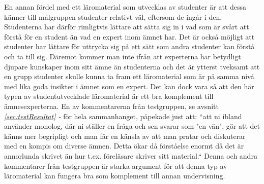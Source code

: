 \documentclass[12pt,a4paper,twoside,openright]{article}
\begin{document}
En annan fördel med ett läromaterial som utvecklas av studenter är att
dessa känner till målgruppen studenter relativt väl, eftersom de ingår
i den. Studenterna har därför rimligtvis lättare att sätta sig in i
vad som är svårt att förstå för en student än vad en expert inom ämnet
har. Det är också möjligt att studenter har lättare för uttrycka sig
på ett sätt som andra studenter kan förstå och ta till sig. Däremot
kommer man inte ifrån att experterna har betydligt djupare kunskaper
inom sitt ämne än studenterna och det är ytterst tveksamt att en grupp
studenter skulle kunna ta fram ett läromaterial som är på samma nivå
med lika goda insikter i ämnet som en expert. Det kan dock vara så att
den här typen av studentutvecklade läromaterial är ett bra komplement
till ämnesexperterna. En av kommentarerna från testgruppen, se avsnitt
\textit{\ref{sec:testResultat} - } för hela
sammanhanget, påpekade just att: “att ni ibland använder monolog, där
ni ställer en fråga och sen svarar som "en vän", gör att det känns mer
begripligt och man får en känsla av att man pratar och diskuterar med
en kompis om diverse ämnen. Detta ökar då förståelse enormt då det är
annorlunda skrivet än hur t.ex. föreläsare skriver sitt material.“
Denna och andra kommentarer från testgruppen är starka argument för
att denna typ av läromaterial kan fungera bra som komplement till
annan undervisning.


\end{document}
